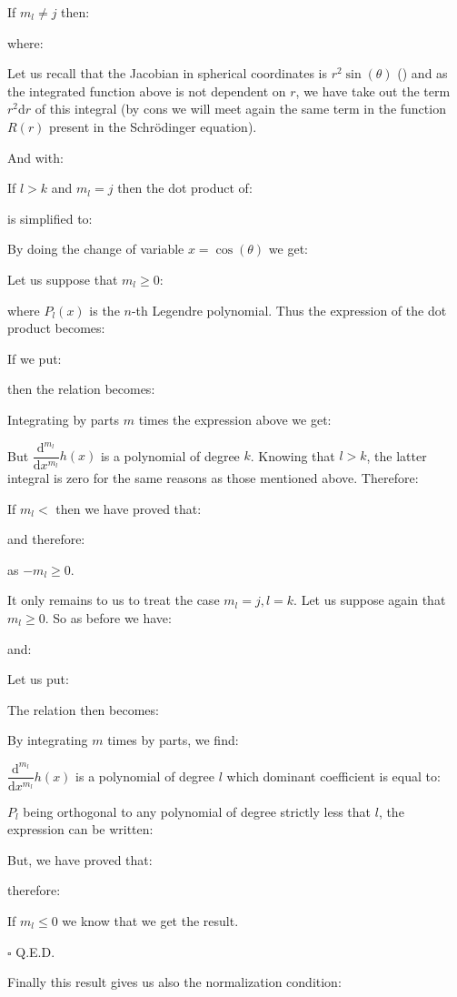 	\begin{dem}
	If $m_l\neq j$ then:
	
	where:
	
	\begin{tcolorbox}[title=Remark,colframe=black,arc=10pt]
	Let us recall that the Jacobian in spherical coordinates is $r^2\sin(\theta)$ () and as the integrated function above is not dependent on $r$, we have take out the term $r^2\mathrm{d}r$ of this integral (by cons we will meet again the same term in the function $R(r)$ present in the Schrödinger equation).
	\end{tcolorbox}
	And with:
	
	If $l>k$ and $m_l=j$ then the dot product of:
	
	is simplified to:
	
	By doing the change of variable $x=\cos(\theta)$ we get:
	
	Let us suppose that $m_l\geq 0$:
	
	where $P_l(x)$ is the $n$-th Legendre polynomial. Thus the expression of the dot product becomes:
	
	If we put:
	
	then the relation becomes:
	
	Integrating by parts $m$ times the expression above we get:
	
	But $\dfrac{\mathrm{d}^{m_l}}{\mathrm{d}x^{m_l}}h(x)$ is a polynomial of degree $k$. Knowing that $l>k$, the latter integral is zero for the same reasons as those mentioned above. Therefore:
	
	If $m_l<$ then we have proved that:
	
	and therefore:
	
	as $-m_l\geq 0$.
	
	It only remains to us to treat the case $m_l=j,l=k$. Let us suppose again that $m_l\geq 0$. So as before we have:
	
	and:
	
	Let us put:
	
	The relation then becomes:
	
	By integrating $m$ times by parts, we find:
	
	$\dfrac{\mathrm{d} ^{m_l}}{\mathrm{d} x^{m_l}}h(x)$ is a polynomial of degree $l$ which dominant coefficient is equal to:
	
	$P_l$ being orthogonal to any polynomial of degree strictly less that $l$, the expression can be written:
	
	But, we have proved that:
	
	therefore:
	
	If $m_l\leq 0$ we know that we get the result.
	\begin{flushright}
		$\square$  Q.E.D.
	\end{flushright}
	\end{dem}
	Finally this result gives us also the normalization condition:
	
